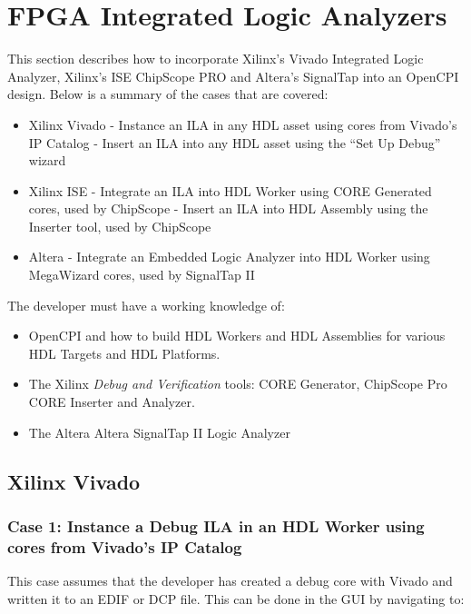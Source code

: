 \section{FPGA Integrated Logic Analyzers}

\begin{flushleft}

	This section describes how to incorporate Xilinx's Vivado Integrated Logic Analyzer, Xilinx's ISE ChipScope PRO and Altera's SignalTap into an OpenCPI design. Below is a summary of the cases that are covered:

	\begin{itemize}
		\item Xilinx Vivado
			\subitem - Instance an ILA in any HDL asset using cores from Vivado's IP Catalog
			\subitem - Insert an ILA into any HDL asset using the ``Set Up Debug'' wizard
	 	\item Xilinx ISE
	 		\subitem - Integrate an ILA into HDL Worker using CORE Generated cores, used by ChipScope
		 	\subitem - Insert an ILA into HDL Assembly using the Inserter tool, used by ChipScope
	 	\item Altera
	 		\subitem - Integrate an Embedded Logic Analyzer into HDL Worker using MegaWizard cores, used by SignalTap II
	\end{itemize}

	The developer must have a working knowledge of:
	\begin{itemize}
	 	\item OpenCPI and how to build HDL Workers and HDL Assemblies for various HDL Targets and HDL Platforms.
		\item The Xilinx \textit{Debug and Verification} tools: CORE Generator, ChipScope Pro CORE Inserter and Analyzer.
		\item The Altera Altera SignalTap II Logic Analyzer
	\end{itemize}

\newpage

\subsection{Xilinx Vivado}
	\subsubsection{Case 1: Instance a Debug ILA in an HDL Worker using cores from Vivado's IP Catalog}
	This case assumes that the developer has created a debug core with Vivado and written it to an EDIF or DCP file. This can be done in the GUI by navigating to:\newline {} \newline


\end{flushleft}

